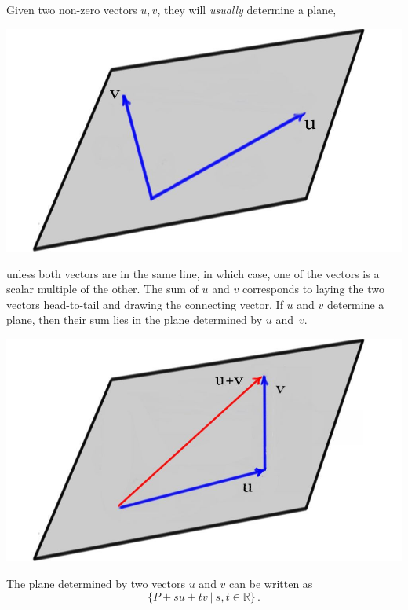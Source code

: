 
Given two non-zero vectors $u,v$, they will \emph{usually} determine a plane, 
\begin{center}
\includegraphics[scale=.28]{uvplane.jpg}
\end{center}
unless both vectors are in the same line,  in which case, one of the vectors is a scalar multiple of the other.  The sum of $u$ and $v$ corresponds to laying the two vectors head-to-tail and drawing the connecting vector.  If $u$ and $v$ determine a plane, then their sum lies in the plane determined by $u$ and~$v$.
\begin{center}
\includegraphics[scale=.28]{u+v.jpg}
\end{center}
The plane determined by two vectors $u$ and $v$ can be written as 
\[\{ P + su + tv ~|~ s, t \in \mathbb{R} \}\, .\]  


